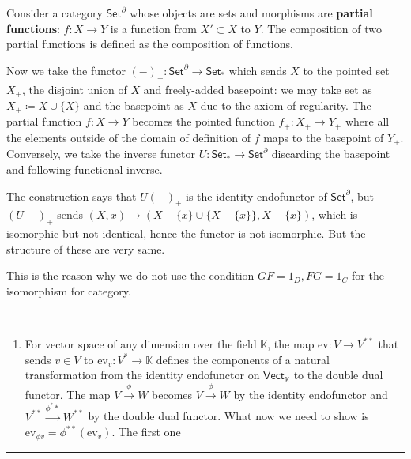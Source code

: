 \begin{exmp}
Consider a category $\mathsf{Set}^{\partial}$ whose objects are sets and morphisms are \textbf{partial functions}: $f:X\rightarrow Y$ is a function from $X'\subset X$ to $Y$. The composition of two partial functions is defined as the composition of functions.

Now we take the functor $(-)_+:\mathsf{Set}^\partial \rightarrow \mathsf{Set}_*$ which sends $X$ to the pointed set $X_+$, the disjoint union of $X$ and freely-added basepoint: we may take set as $X_+\coloneqq X\cup \{X\}$ and the basepoint as $X$ due to the axiom of regularity. The partial function $f:X\rightarrow Y$ becomes the pointed function $f_+:X_+\rightarrow Y_+$ where all the elements outside of the domain of definition of $f$ maps to the basepoint of $Y_+$. Conversely, we take the inverse functor $U:\mathsf{Set}_*\rightarrow \mathsf{Set}^\partial$ discarding the basepoint and following functional inverse.

The construction says that $U(-)_+$ is the identity endofunctor of $\mathsf{Set}^\partial$, but $(U-)_+$ sends $(X,x)\rightarrow (X-\{x\}\cup \{X-\{x\}\},X-\{x\})$, which is isomorphic but not identical, hence the functor is not isomorphic. But the structure of these are very same.

This is the reason why we do not use the condition $GF=1_D,FG=1_C$ for the isomorphism for category.
\end{exmp}

\begin{exmp}
~\begin{enumerate}
\item For vector space of any dimension over the field $\mathbb{K}$, the map $\mathrm{ev}:V\rightarrow V^{**}$ that sends $v\in V$ to $\mathrm{ev}_v:V^*\rightarrow \mathbb{K}$ defines the components of a natural transformation from the identity endofunctor on $\mathsf{Vect}_{\mathbb{K}}$ to the double dual functor. The map $V\xrightarrow{\phi}W$ becomes $V\xrightarrow{\phi}W$ by the identity endofunctor and $V^{**}\xrightarrow{\phi^**}W^{**}$ by the double dual functor. What now we need to show is $\mathrm{ev}_{\phi v}=\phi^{**}(\mathrm{ev}_v)$. The first one 
\end{enumerate}
\end{exmp}

\noindent\rule{\textwidth}{1pt}
\newline